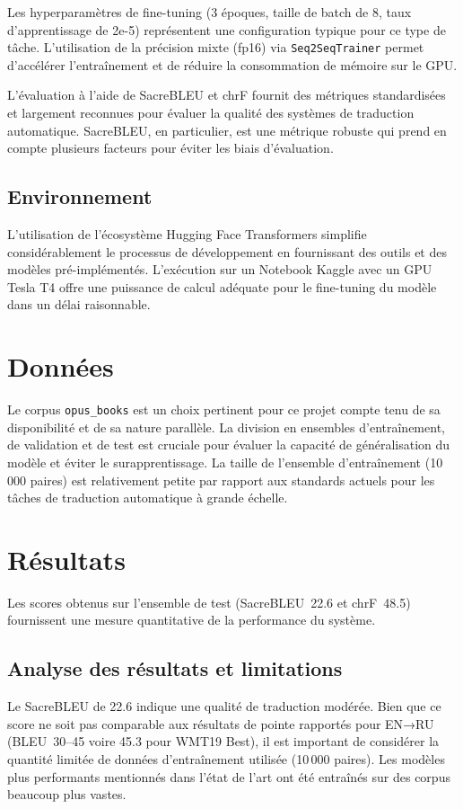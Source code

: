 \documentclass[11pt,a4paper]{article}
\begin{document}
Les hyperparamètres de fine-tuning (3 époques, taille de batch de 8, taux d'apprentissage de 2e-5) représentent une configuration typique pour ce type de tâche. L'utilisation de la précision mixte (fp16) via \texttt{Seq2SeqTrainer} permet d'accélérer l'entraînement et de réduire la consommation de mémoire sur le GPU.

L'évaluation à l'aide de SacreBLEU et chrF fournit des métriques standardisées et largement reconnues pour évaluer la qualité des systèmes de traduction automatique. SacreBLEU, en particulier, est une métrique robuste qui prend en compte plusieurs facteurs pour éviter les biais d'évaluation.

\subsection{Environnement}
L'utilisation de l'écosystème Hugging Face Transformers simplifie considérablement le processus de développement en fournissant des outils et des modèles pré-implémentés. L'exécution sur un Notebook Kaggle avec un GPU Tesla T4 offre une puissance de calcul adéquate pour le fine-tuning du modèle dans un délai raisonnable.

\section{Données}
Le corpus \texttt{opus\_books}\citep{Tiedemann2009Parallel} est un choix pertinent pour ce projet compte tenu de sa disponibilité et de sa nature parallèle. La division en ensembles d'entraînement, de validation et de test est cruciale pour évaluer la capacité de généralisation du modèle et éviter le surapprentissage. La taille de l'ensemble d'entraînement (10\,000 paires) est relativement petite par rapport aux standards actuels pour les tâches de traduction automatique à grande échelle.

\section{Résultats}
Les scores obtenus sur l'ensemble de test (SacreBLEU~22.6 et chrF~48.5) fournissent une mesure quantitative de la performance du système.

\subsection{Analyse des résultats et limitations}
Le SacreBLEU de 22.6 indique une qualité de traduction modérée. Bien que ce score ne soit pas comparable aux résultats de pointe rapportés pour EN→RU (BLEU~30–45 voire 45.3 pour WMT19 Best), il est important de considérer la quantité limitée de données d'entraînement utilisée (10\,000 paires). Les modèles plus performants mentionnés dans l'état de l'art ont été entraînés sur des corpus beaucoup plus vastes.
\end{document}
